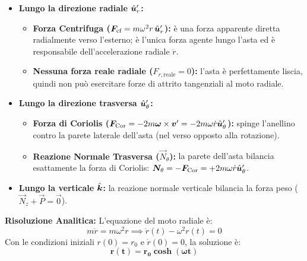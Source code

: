 \begin{tcolorbox}[enhanced, breakable, colback=forestgreen!5!white, colframe=forestgreen!80!black,
    title={\textbf{Analisi delle Forze nel Riferimento Rotante $S'$}}, fonttitle=\bfseries\sffamily]
\begin{itemize}
    \item \textbf{Lungo la direzione radiale $\hat{\bm{u}}_r'$:}
    \begin{itemize}
        \item \textbf{Forza Centrifuga ($\bm{F}_{\text{cf}} = m\omega^2 r\,\hat{\bm{u}}_r'$):} è una forza apparente diretta radialmente verso l'esterno; è l'unica forza agente lungo l'asta ed è responsabile dell'accelerazione radiale $\ddot{r}$.
        \item \textbf{Nessuna forza reale radiale ($F_{r,\text{reale}} = 0$):} l'asta è perfettamente liscia, quindi non può esercitare forze di attrito tangenziali al moto radiale.
    \end{itemize}
    \item \textbf{Lungo la direzione trasversa $\hat{\bm{u}}_\theta'$:}
    \begin{itemize}
        \item \textbf{Forza di Coriolis ($\bm{F}_{\text{Cor}} = -2m\bm{\omega}\times\bm{v}' = -2m\omega\dot{r}\hat{\bm{u}}_\theta'$):} spinge l'anellino contro la parete laterale dell'asta (nel verso opposto alla rotazione).
        \item \textbf{Reazione Normale Trasversa ($\vec{N}_\theta$):} la parete dell'asta bilancia esattamente la forza di Coriolis: $\bm{N}_\theta = -\bm{F}_{\text{Cor}} = +2m\omega\dot{r}\hat{\bm{u}}_\theta'$.
    \end{itemize}
    \item \textbf{Lungo la verticale $\hat{\bm{k}}$:} la reazione normale verticale bilancia la forza peso ($\vec{N}_z + \vec{P} = \vec{0}$).
\end{itemize}
\end{tcolorbox}

\textbf{Risoluzione Analitica:}
L'equazione del moto radiale è:
\begin{equation}
    m\ddot{r} = m\omega^2 r \implies \ddot{r}(t) - \omega^2 r(t) = 0
\end{equation}
Con le condizioni iniziali $r(0) = r_0$ e $\dot{r}(0) = 0$, la soluzione è:
\begin{equation}
    \mathbf{r(t) = r_0 \cosh(\omega t)}
\end{equation}

\vspace{0.8em}

